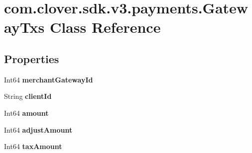 \hypertarget{classcom_1_1clover_1_1sdk_1_1v3_1_1payments_1_1_gateway_txs}{}\section{com.\+clover.\+sdk.\+v3.\+payments.\+Gateway\+Txs Class Reference}
\label{classcom_1_1clover_1_1sdk_1_1v3_1_1payments_1_1_gateway_txs}
\subsection*{Properties}
\begin{DoxyCompactItemize}
\item 
\mbox{\label{classcom_1_1clover_1_1sdk_1_1v3_1_1payments_1_1_gateway_txs_a577b3578ce6a3d092c2fe5984ebff020}} 
Int64 {\bfseries merchant\+Gateway\+Id}
\item 
\mbox{\label{classcom_1_1clover_1_1sdk_1_1v3_1_1payments_1_1_gateway_txs_a82fcb2991e0e8d3069e65e8032a2fd07}} 
String {\bfseries client\+Id}
\item 
\mbox{\label{classcom_1_1clover_1_1sdk_1_1v3_1_1payments_1_1_gateway_txs_a0813723a88580b760b16aa517b2cb210}} 
Int64 {\bfseries amount}
\item 
\mbox{\label{classcom_1_1clover_1_1sdk_1_1v3_1_1payments_1_1_gateway_txs_af67a09cebf61529eef102fa254a28974}} 
Int64 {\bfseries adjust\+Amount}
\item 
\mbox{\label{classcom_1_1clover_1_1sdk_1_1v3_1_1payments_1_1_gateway_txs_ad81ed8f33528dd21d0f43edbde74dcc4}} 
Int64 {\bfseries tax\+Amount}

\end{DoxyCompactItemize}
